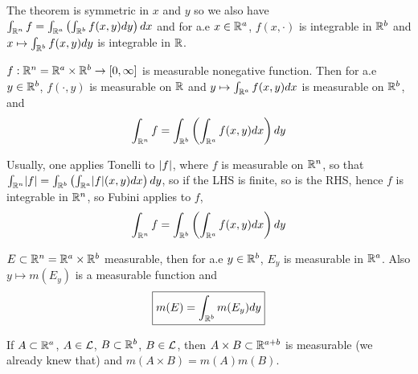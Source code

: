 The theorem is symmetric in $x$ and $y$ so we also have $\int_{\mathbb{R}^n} f = \int_{\mathbb{R}^a} \left( \int_{\mathbb{R}^b} f(x,y)dy \right)dx$ and for a.e $x \in \mathbb{R}^a$, $f(x,\cdot)$ is integrable in $\mathbb{R}^b$ and $x \mapsto \int_{\mathbb{R}^b} f(x,y)dy$ is integrable in $\mathbb{R}$.

\begin{corollary}
    $f: \mathbb{R}^n = \mathbb{R}^a \times \mathbb{R}^b \rightarrow [0, \infty]$ is measurable nonegative function.
    Then for a.e $y \in \mathbb{R}^b$, $f(\cdot, y)$ is measurable on $\mathbb{R}$ and $y \mapsto \int_{\mathbb{R}^a} f(x,y) dx$ is measurable on $\mathbb{R}^b$, and
    \[
        \int_{\mathbb{R}^n} f = \int_{\mathbb{R}^b} \left(  \int_{\mathbb{R}^a} f(x,y)dx \right)dy
    \]
\end{corollary}

Usually, one applies Tonelli to $\lvert f\rvert$, where $f$ is measurable on $\mathbb{R}^n$, so that $\int_{\mathbb{R}^n} \lvert f\rvert = \int_{\mathbb{R}^b} \left( \int_{\mathbb{R}^a} \lvert f\rvert (x,y) dx \right)dy$, so if the LHS is finite, so is the RHS, hence $f$ is integrable in $\mathbb{R}^n$, so Fubini applies to $f$,
\[
    \int_{\mathbb{R}^n} f = \int_{\mathbb{R}^b} \left( \int_{\mathbb{R}^a} f(x,y)dx \right)dy
\]

\begin{corollary}
    $E \subset \mathbb{R}^n = \mathbb{R}^a \times \mathbb{R}^b$ measurable, then for a.e $y \in \mathbb{R}^b$, $E_y$ is measurable in $\mathbb{R}^a$.
    Also $y \mapsto m(E_y)$ is a measurable function and
    \[
        \boxed{m(E) = \int_{\mathbb{R}^b} m(E_y) dy}
    \]
\end{corollary}

\begin{corollary}
    If $A \subset \mathbb{R}^a$, $A \in \mathcal{L}$, $B \subset \mathbb{R}^b$, $B \in \mathcal{L}$, then $A \times B \subset \mathbb{R}^{a+b}$ is measurable (we already knew that) and $m(A \times B) = m(A)m(B)$.
\end{corollary}